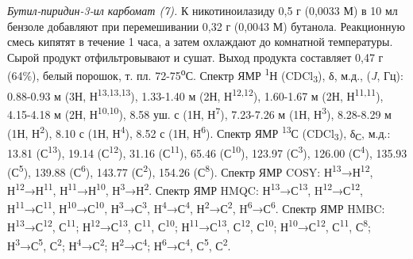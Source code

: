 \begin{multicols}{2}
\emph{Бутил-пиридин-3-ил карбомат (7).} К никотиноилазиду 0,5 г (0,0033
М) в 10 мл бензоле добавляют при перемешивании 0,32 г (0,0043 М)
бутанола. Реакционную смесь кипятят в течение 1 часа, а затем охлаждают
до комнатной температуры. Сырой продукт отфильтровывают и сушат. Выход
продукта составляет 0,47 г (64\%), белый порошок, т. пл.
72-75\textsuperscript{о}С. Спектр ЯМР \textsuperscript{1}Н
(CDCl\textsubscript{3}), δ, м.д., (\emph{J}, Гц): 0.88-0.93 м (3Н,
Н\textsuperscript{13,13,13}), 1.33-1.40 м (2Н,
Н\textsuperscript{12,12}), 1.60-1.67 м (2Н, Н\textsuperscript{11,11}),
4.15-4.18 м (2Н, Н\textsuperscript{10,10}), 8.58 уш. с (1Н,
Н\textsuperscript{7}), 7.23-7.26 м (1Н, Н\textsuperscript{3}), 8.28-8.29
м (1Н, Н\textsuperscript{2}), 8.10 с (1Н, Н\textsuperscript{4}), 8.52 с
(1Н, Н\textsuperscript{6}). Спектр ЯМР \textsuperscript{13}С
(CDCl\textsubscript{3}), δ\textsubscript{С}, м.д.: 13.81
(С\textsuperscript{13}), 19.14 (С\textsuperscript{12}), 31.16
(С\textsuperscript{11}), 65.46 (С\textsuperscript{10}), 123.97
(С\textsuperscript{3}), 126.00 (С\textsuperscript{4}), 135.93
(С\textsuperscript{5}), 139.88 (С\textsuperscript{6}), 143.77
(С\textsuperscript{2}), 154.26 (С\textsuperscript{8}). Спектр ЯМР COSY:
Н\textsuperscript{13}→Н\textsuperscript{12},
Н\textsuperscript{12}→Н\textsuperscript{11},
Н\textsuperscript{11}→Н\textsuperscript{10},
Н\textsuperscript{3}→Н\textsuperscript{2}. Спектр ЯМР HMQC:
Н\textsuperscript{13}→С\textsuperscript{13},
H\textsuperscript{12}→С\textsuperscript{12},
Н\textsuperscript{11}→С\textsuperscript{11},
Н\textsuperscript{10}→С\textsuperscript{10},
Н\textsuperscript{3}→С\textsuperscript{3},
H\textsuperscript{4}→С\textsuperscript{4},
Н\textsuperscript{2}→С\textsuperscript{2},
H\textsuperscript{6}→С\textsuperscript{6}. Спектр ЯМР HMBC:
Н\textsuperscript{13}→С\textsuperscript{12}, С\textsuperscript{11};
Н\textsuperscript{12}→С\textsuperscript{13}, С\textsuperscript{11},
С\textsuperscript{10}; Н\textsuperscript{11}→С\textsuperscript{13},
С\textsuperscript{12}, С\textsuperscript{10};
Н\textsuperscript{10}→С\textsuperscript{12}, С\textsuperscript{11},
С\textsuperscript{8}; Н\textsuperscript{3}→С\textsuperscript{5},
С\textsuperscript{2}; Н\textsuperscript{4}→С\textsuperscript{2};
Н\textsuperscript{2}→С\textsuperscript{4};
Н\textsuperscript{6}→С\textsuperscript{4}, С\textsuperscript{5},
С\textsuperscript{2}.


\end{multicols}
